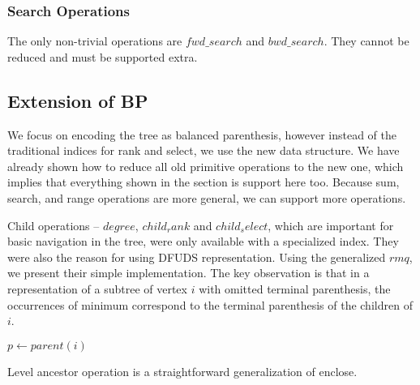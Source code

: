 \subsubsection{Search Operations}

The only non-trivial operations are $fwd\_search$ and $bwd\_search$.
They cannot be reduced and must be supported extra.


\subsection{Extension of BP}

We focus on encoding the tree as balanced parenthesis, however instead of the traditional indices for rank and select, we use the new data structure.
We have already shown how to reduce all old primitive operations to the new one, which implies that everything shown in the section  is support here too.
Because sum, search, and range operations are more general, we can support more operations.

Child operations -- $degree$, $child_rank$ and $child_select$, which are important for basic navigation in the tree, were only available with a specialized index.
They were also the reason for using DFUDS representation.
Using the generalized $rmq$, we present their simple implementation.
The key observation is that in a representation of a subtree of vertex $i$ with omitted terminal parenthesis, the occurrences of minimum correspond to the terminal parenthesis of the children of $i$.

\begin{algorithmic}
	\State {}
\EndFunction
\end{algorithmic}

\begin{algorithmic}
	\State $p \gets parent(i)$
	\State {}
\EndFunction
\end{algorithmic}

\begin{algorithmic}
	\State {}
\EndFunction
\end{algorithmic}

Level ancestor operation is a straightforward generalization of enclose.

